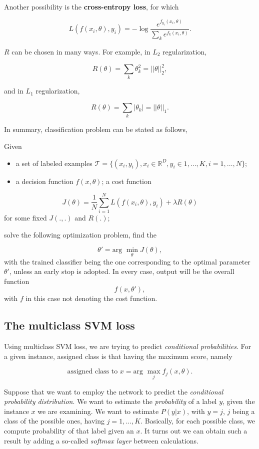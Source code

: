 \documentclass[10pt]{report}
\begin{document}
Another possibility is the \textbf{cross-entropy loss}, for which

\[L(f(x_i, \theta), y_i) = -\log{\frac{e^{f_{y_i}(x_i, \theta)}}{\sum_k e^{f_k(x_i, \theta)}}}.\]

\(R\) can be chosen in many ways. For example, in \(L_2\)
regularization,

\[R(\theta) = \sum_{k} \theta^2_k = ||\theta||_ 2^2,\]

and in \(L_1\) regularization,

\[R(\theta) = \sum_{k} |\theta_k| = ||\theta||_ 1.\]

In summary, classification problem can be stated as follows,

Given

\begin{itemize}
\item a set of labeled examples
\(\mathcal{T} = \{(x_i, y_i), x_i \in \mathbb{R}^D, y_i \in 1, \dots, K, i = 1, \dots, N \};\)
\item a decision function \(f(x, \theta)\); a cost function
\end{itemize}

\[J(\theta) = \frac{1}{N} \sum_ {i=1}^{N} L(f(x_i, \theta), y_i) + \lambda R(\theta)\]
for some fixed \(J(.,.)\) and \(R(.)\);

solve the following optimization problem, find the

\[\theta' = \mbox{arg } \min_\theta J(\theta),\] with the trained
classifier being the one corresponding to the optimal parameter
\(\theta'\), unless an early stop is adopted. In every case, output will
be the overall function \[f(x, \theta'),\] with \(f\) in this case not
denoting the cost function.

\subsection{The multiclass SVM loss}
\label{the-multiclass-svm-loss}
Using multiclass SVM loss, we are trying to predict \emph{conditional
probabilities}. For a given instance, assigned class is that having the
maximum score, namely

\[\mbox{assigned class to } x = \mbox{arg } \max_j f_j(x, \theta).\]

Suppose that we want to employ the network to predict the \emph{conditional
probability distribution}. We want to estimate the \emph{probability} of a
label \(y\), given the instance \(x\) we are examining. We want to
estimate \(P(y|x)\), with \(y = j\), \(j\) being a class of the possible
ones, having \(j = 1, \dots, K\). Basically, for each possible class, we
compute probability of that label given an \(x\). It turns out we can
obtain such a result by adding a so-called \emph{softmax layer} between
calculations.
\end{document}
